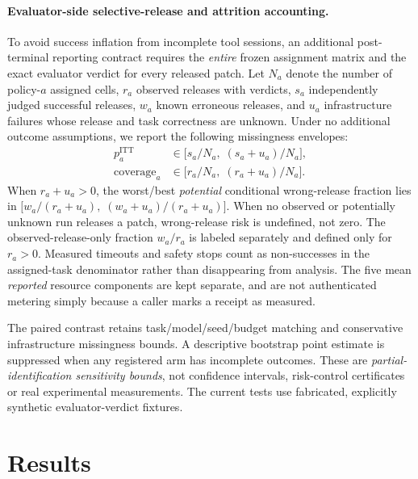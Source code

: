 \documentclass[pdflatex,sn-basic]{sn-jnl}
\begin{document}
\paragraph{Evaluator-side selective-release and attrition accounting.}
To avoid success inflation from incomplete tool sessions, an
additional post-terminal reporting contract requires the
\emph{entire} frozen assignment matrix and the exact
evaluator verdict for every released patch. Let $N_a$
denote the number of policy-$a$ assigned cells, $r_a$
observed releases with verdicts, $s_a$ independently
judged successful releases, $w_a$ known erroneous
releases, and $u_a$ infrastructure failures whose
release and task correctness are unknown.
Under no additional outcome assumptions, we report
the following missingness envelopes:
\begin{align}
p_a^{\mathrm{ITT}} &\in
 \bigl[s_a/N_a,\;(s_a+u_a)/N_a\bigr],
 \label{eq:itt_missing_envelope}\\
\mathrm{coverage}_a &\in
 \bigl[r_a/N_a,\;(r_a+u_a)/N_a\bigr].
 \label{eq:coverage_missing_envelope}
\end{align}
When $r_a+u_a>0$, the worst/best \emph{potential}
conditional wrong-release fraction lies in
$\bigl[w_a/(r_a+u_a),\;
(w_a+u_a)/(r_a+u_a)\bigr]$.
When no observed or potentially unknown run releases
a patch, wrong-release risk is undefined, not zero.
The observed-release-only fraction $w_a/r_a$
is labeled separately and defined only for $r_a>0$.
Measured timeouts and safety stops count as
non-successes in the assigned-task denominator
rather than disappearing from analysis. The five
mean \emph{reported} resource components are
kept separate, and are not authenticated metering
simply because a caller marks a receipt as measured.

The paired contrast retains task/model/seed/budget
matching and conservative infrastructure missingness
bounds. A descriptive bootstrap point estimate is
suppressed when any registered arm has incomplete
outcomes. These are \emph{partial-identification
sensitivity bounds}, not confidence intervals,
risk-control certificates or real experimental
measurements. The current tests use fabricated,
explicitly synthetic evaluator-verdict fixtures.

\section{Results}\label{sec:results}
\end{document}
